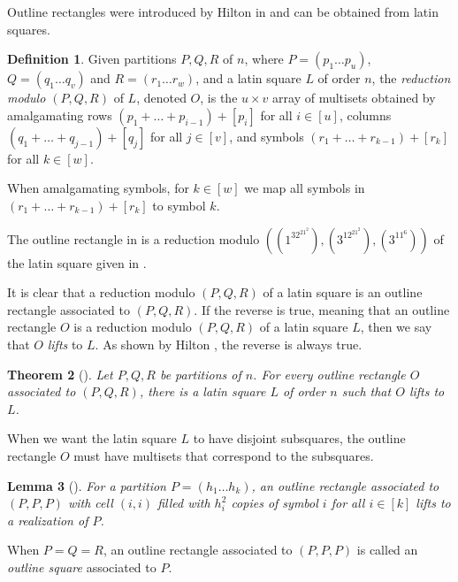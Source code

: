 \documentclass{sn-jnl}
\newtheorem{theorem}{Theorem}[section]
\newtheorem{lemma}[theorem]{Lemma}
\theoremstyle{definition}
\newtheorem{definition}[theorem]{Definition}
\begin{document}
Outline rectangles were introduced by Hilton in \cite{hilton1980reconstruction} and can be obtained from latin squares.

\begin{definition}
    Given partitions $P,Q,R$ of $n$, where $P = (p_1\dots p_u)$, $Q = (q_1\dots q_v)$ and $R = (r_1\dots r_w)$, and a latin square $L$ of order $n$, the \emph{reduction modulo $(P,Q,R)$} of $L$, denoted $O$, is the $u\times v$ array of multisets obtained by amalgamating rows $(p_1 + \dots + p_{i-1}) + [p_i]$ for all $i\in[u]$, columns $(q_1 + \dots + q_{j-1}) + [q_j]$ for all $j\in[v]$, and symbols $(r_1 + \dots + r_{k-1}) + [r_k]$ for all $k\in[w]$.

    When amalgamating symbols, for $k\in[w]$ we map all symbols in $(r_1 + \dots + r_{k-1}) + [r_k]$ to symbol $k$.
\end{definition}

The outline rectangle in  is a reduction modulo $((1^32^21^2),(3^12^21^2),(3^11^6))$ of the latin square given in .

It is clear that a reduction modulo $(P,Q,R)$ of a latin square is an outline rectangle associated to $(P,Q,R)$. If the reverse is true, meaning that an outline rectangle $O$ is a reduction modulo $(P,Q,R)$ of a latin square $L$, then we say that $O$ \emph{lifts} to $L$. As shown by Hilton \cite{hilton1980reconstruction}, the reverse is always true.

\begin{theorem}[\cite{hilton1980reconstruction}]
\label{outline rectangle to square}
    Let $P,Q,R$ be partitions of $n$. For every outline rectangle $O$ associated to $(P,Q,R)$, there is a latin square $L$ of order $n$ such that $O$ lifts to $L$.
\end{theorem}

When we want the latin square $L$ to have disjoint subsquares, the outline rectangle $O$ must have multisets that correspond to the subsquares.

\begin{lemma}[\cite{kuhl2019existence}]
\label{outline to realization}
    For a partition $P = (h_1\dots h_k)$, an outline rectangle associated to $(P,P,P)$ with cell $(i,i)$ filled with $h_i^2$ copies of symbol $i$ for all $i\in[k]$ lifts to a realization of $P$.
\end{lemma}

When $P=Q=R$, an outline rectangle associated to $(P,P,P)$ is called an \emph{outline square} associated to $P$.
\end{document}
